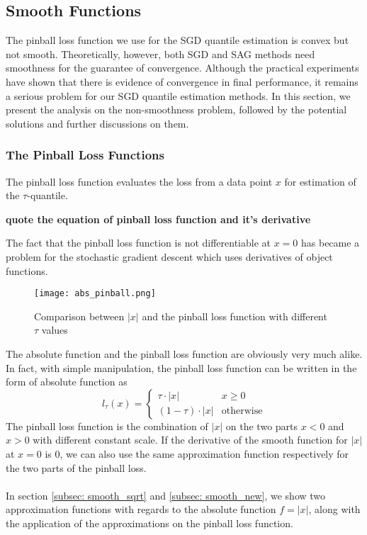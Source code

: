 \subsection{Smooth Functions}
The pinball loss function we use for the SGD quantile estimation is convex but not smooth. 
Theoretically, however, both SGD and SAG methods need smoothness for the guarantee of convergence. Although the practical experiments have shown that there is evidence of convergence in final performance, it remains a serious problem for our SGD quantile estimation methods. In this section, we present the analysis on the non-smoothness problem, followed by the potential solutions and further discussions on them.

\subsubsection{The Pinball Loss Functions}
\graphicspath{{Figures/Stepsize_adapt/Smooth_func/}{./}} 

The pinball loss function evaluates the loss from a data point $x$ for estimation of the $\tau$-quantile.

\textbf{quote the equation of pinball loss function and it's derivative}

The fact that the pinball loss function is not differentiable at $x= 0$ has became a problem for the stochastic gradient descent which uses derivatives of object functions.

\begin{figure*}[h!]
	\texttt{[image: abs\_pinball.png]}
	\caption{Comparison between $|x|$ and the pinball loss function with different $\tau$ values}
\end{figure*}

The absolute function and the pinball loss function are obviously very much alike. In fact, with simple manipulation, the pinball loss function can be written in the form of absolute function as 
\begin{equation}
    l_\tau(x) = 
    \begin{cases}
        \tau \cdot |x| & {x \geq 0} \\
        (1-\tau) \cdot |x| & \text{otherwise}
    \end{cases}
\end{equation}
The pinball loss function is the combination of $|x|$ on the two parts $x<0$ and $x>0$ with different constant scale. 
If the derivative of the smooth function for $|x|$ at $x=0$ is $0$, we can also use the same approximation function respectively for the two parts of the pinball loss.
\\\\
In section \ref{subsec: smooth_sqrt} and \ref{subsec: smooth_new}, we show two approximation functions with regards to the absolute function $f = |x|$, along with the application of the approximations on the pinball loss function.

